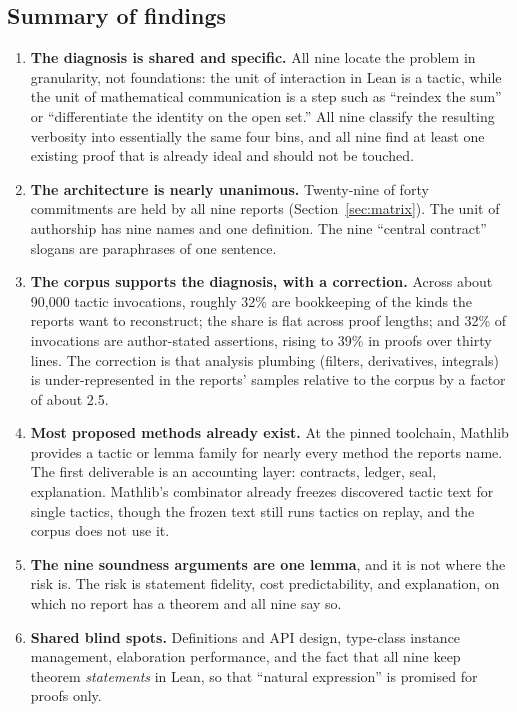 \documentclass[11pt,a4paper]{article}
\newcommand{\code}[1]{\texttt{\detokenize{#1}}}
\theoremstyle{definition}
\begin{document}
\subsection{Summary of findings}
\begin{enumerate}
\item \textbf{The diagnosis is shared and specific.} All nine locate the problem in granularity, not foundations: the unit of interaction in Lean is a tactic, while the unit of mathematical communication is a step such as ``reindex the sum'' or ``differentiate the identity on the open set.'' All nine classify the resulting verbosity into essentially the same four bins, and all nine find at least one existing proof that is already ideal and should not be touched.
\item \textbf{The architecture is nearly unanimous.} Twenty-nine of forty commitments are held by all nine reports (Section~\ref{sec:matrix}). The unit of authorship has nine names and one definition. The nine ``central contract'' slogans are paraphrases of one sentence.
\item \textbf{The corpus supports the diagnosis, with a correction.} Across about 90,000 tactic invocations, roughly 32\% are bookkeeping of the kinds the reports want to reconstruct; the share is flat across proof lengths; and 32\% of invocations are author-stated assertions, rising to 39\% in proofs over thirty lines. The correction is that analysis plumbing (filters, derivatives, integrals) is under-represented in the reports' samples relative to the corpus by a factor of about 2.5.
\item \textbf{Most proposed methods already exist.} At the pinned toolchain, Mathlib provides a tactic or lemma family for nearly every method the reports name. The first deliverable is an accounting layer: contracts, ledger, seal, explanation. Mathlib's \code{says} combinator already freezes discovered tactic text for single tactics, though the frozen text still runs tactics on replay, and the corpus does not use it.
\item \textbf{The nine soundness arguments are one lemma}, and it is not where the risk is. The risk is statement fidelity, cost predictability, and explanation, on which no report has a theorem and all nine say so.
\item \textbf{Shared blind spots.} Definitions and API design, type-class instance management, elaboration performance, and the fact that all nine keep theorem \emph{statements} in Lean, so that ``natural expression'' is promised for proofs only.

\end{enumerate}
\end{document}
